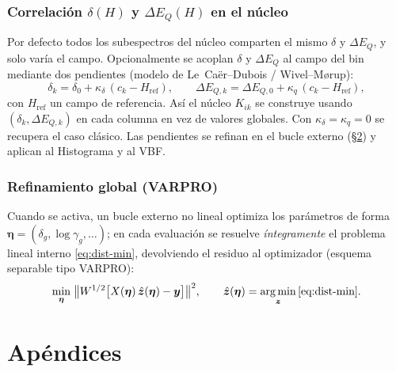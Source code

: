 \documentclass[11pt,a4paper]{article}
\newcommand{\dEQ}{\Delta E_{Q}}
\DeclareMathOperator*{\argmin}{arg\,min}
\begin{document}
\section{Correlación \texorpdfstring{$\delta(H)$}{d(H)} y \texorpdfstring{$\dEQ(H)$}{DEQ(H)} en el núcleo}\label{sec:dist-corr}
Por defecto todos los subespectros del núcleo comparten el mismo $\delta$ y
$\dEQ$, y solo varía el campo. Opcionalmente se acoplan $\delta$ y $\dEQ$ al campo
del bin mediante dos pendientes (modelo de Le~Caër--Dubois / Wivel--M\o{}rup):
\begin{equation}
  \delta_k = \delta_0 + \kappa_\delta\,(c_k-H_{\text{ref}}),\qquad
  \Delta E_{Q,k} = \Delta E_{Q,0} + \kappa_q\,(c_k-H_{\text{ref}}),
\end{equation}
con $H_{\text{ref}}$ un campo de referencia. Así el núcleo $K_{ik}$ se construye
usando $(\delta_k,\Delta E_{Q,k})$ en cada columna en vez de valores globales. Con
$\kappa_\delta=\kappa_q=0$ se recupera el caso clásico. Las pendientes se refinan
en el bucle externo (\S\ref{sec:refine}) y aplican al Histograma y al VBF.

\section{Refinamiento global (VARPRO)}\label{sec:refine}
Cuando se activa, un bucle externo no lineal optimiza los parámetros de forma
$\bm\eta=(\delta_g,\log\gamma_g,\dots)$; en cada evaluación se resuelve
\emph{íntegramente} el problema lineal interno \eqref{eq:dist-min}, devolviendo el
residuo al optimizador (esquema separable tipo VARPRO):
\begin{equation}
  \min_{\bm\eta}\;\bigl\|W^{1/2}\bigl[X(\bm\eta)\,\hat{\bm z}(\bm\eta)-\bm y\bigr]\bigr\|^2,
  \qquad \hat{\bm z}(\bm\eta)=\argmin_{\bm z}\eqref{eq:dist-min}.
\end{equation}

\appendix
\part{Apéndices}
\end{document}
